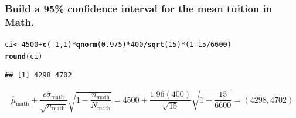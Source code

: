 \documentclass[oneside]{book}\usepackage[]{graphicx}\usepackage[dvipsnames,table,xcdraw]{xcolor}
\makeatletter
\newcommand{\hlnum}[1]{\textcolor[rgb]{0.686,0.059,0.569}{#1}}%
\newcommand{\hlopt}[1]{\textcolor[rgb]{0,0,0}{#1}}%
\newcommand{\hlstd}[1]{\textcolor[rgb]{0.345,0.345,0.345}{#1}}%
\newcommand{\hlkwb}[1]{\textcolor[rgb]{0.69,0.353,0.396}{#1}}%
\newcommand{\hlkwd}[1]{\textcolor[rgb]{0.737,0.353,0.396}{\textbf{#1}}}%
\newenvironment{kframe}{%
 \def\at@end@of@kframe{}%
 \ifinner\ifhmode%
  \def\at@end@of@kframe{\end{minipage}}%
  \begin{minipage}{\columnwidth}%
 \fi\fi%
 \def\FrameCommand##1{\hskip\@totalleftmargin \hskip-\fboxsep
 \colorbox{shadecolor}{##1}\hskip-\fboxsep
     \hskip-\linewidth \hskip-\@totalleftmargin \hskip\columnwidth}%
 \MakeFramed {\advance\hsize-\width
   \@totalleftmargin\z@ \linewidth\hsize
   \@setminipage}}%
 {\par\unskip\endMakeFramed%
 \at@end@of@kframe}
\newenvironment{knitrout}{}{} %
\makeatother
\begin{document}
\subsubsection*{Build a 95\% confidence interval for the mean tuition in Math.}
\begin{knitrout}
\color{fgcolor}\begin{kframe}
\begin{alltt}
\hlstd{ci} \hlkwb{<-} \hlnum{4500} \hlopt{+} \hlkwd{c}\hlstd{(}\hlopt{-}\hlnum{1}\hlstd{,} \hlnum{1}\hlstd{)} \hlopt{*} \hlkwd{qnorm}\hlstd{(}\hlnum{0.975}\hlstd{)} \hlopt{*} \hlnum{400}\hlopt{/}\hlkwd{sqrt}\hlstd{(}\hlnum{15}\hlstd{)} \hlopt{*} \hlstd{(}\hlnum{1} \hlopt{-} \hlnum{15}\hlopt{/}\hlnum{6600}\hlstd{)}
\hlkwd{round}\hlstd{(ci)}
\end{alltt}
\begin{verbatim}
## [1] 4298 4702
\end{verbatim}
\end{kframe}
\end{knitrout}
\[ \hat{\mu}_\text{math}\pm\frac{c\hat{\sigma}_\text{math}}{\sqrt{n_\text{math}}}\sqrt{1-\frac{n_\text{math}}{N_\text{math}}}=4500\pm \frac{1.96(400)}{\sqrt{15}} \sqrt{1-\frac{15}{6600} }=(4298,4702)\]
\end{document}

